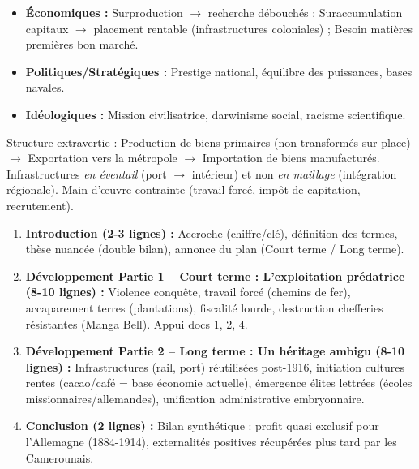 \documentclass[11pt]{article}
\begin{document}
\begin{definition}
\begin{itemize}
    \item \textbf{Économiques :} Surproduction $\rightarrow$ recherche débouchés ; Suraccumulation capitaux $\rightarrow$ placement rentable (infrastructures coloniales) ; Besoin matières premières bon marché.
    \item \textbf{Politiques/Stratégiques :} Prestige national, équilibre des puissances, bases navales.
    \item \textbf{Idéologiques :} Mission civilisatrice, darwinisme social, racisme scientifique.
\end{itemize}
\end{definition}

\begin{propriete}
Structure extravertie : Production de biens primaires (non transformés sur place) $\rightarrow$ Exportation vers la métropole $\rightarrow$ Importation de biens manufacturés. Infrastructures \emph{en éventail} (port $\rightarrow$ intérieur) et non \emph{en maillage} (intégration régionale). Main-d'œuvre contrainte (travail forcé, impôt de capitation, recrutement).
\end{propriete}

\begin{methode}
\begin{enumerate}
    \item \textbf{Introduction (2-3 lignes) :} Accroche (chiffre/clé), définition des termes, thèse nuancée (double bilan), annonce du plan (Court terme / Long terme).
    \item \textbf{Développement Partie 1 -- Court terme : L'exploitation prédatrice (8-10 lignes) :} Violence conquête, travail forcé (chemins de fer), accaparement terres (plantations), fiscalité lourde, destruction chefferies résistantes (Manga Bell). Appui docs 1, 2, 4.
    \item \textbf{Développement Partie 2 -- Long terme : Un héritage ambigu (8-10 lignes) :} Infrastructures (rail, port) réutilisées post-1916, initiation cultures rentes (cacao/café = base économie actuelle), émergence élites lettrées (écoles missionnaires/allemandes), unification administrative embryonnaire.
    \item \textbf{Conclusion (2 lignes) :} Bilan synthétique : profit quasi exclusif pour l'Allemagne (1884-1914), externalités positives récupérées plus tard par les Camerounais.
\end{enumerate}
\end{methode}
\end{document}
